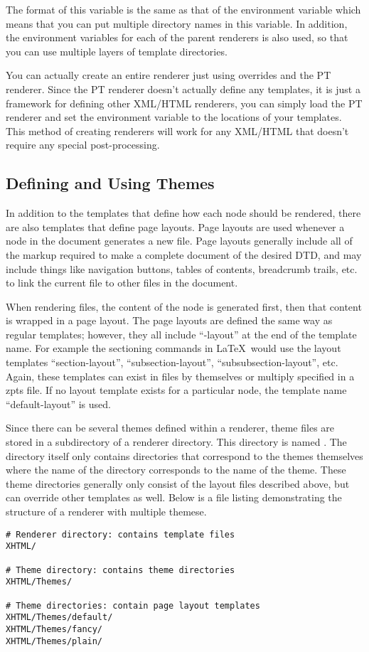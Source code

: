 The format of this variable is the same as that of the 
environment variable which means that you can put multiple directory
names in this variable.  In addition, the environment variables for
each of the parent renderers is also used, so that you can use
multiple layers of template directories.

You can actually create an entire renderer just using overrides and the
PT renderer.  Since the PT renderer doesn't actually define any templates,
it is just a framework for defining other XML/HTML renderers, you can
simply load the PT renderer and set the 
environment
variable to the locations of your templates.  This method of creating
renderers will work for any XML/HTML that doesn't require any special
post-processing.


\subsection{Defining and Using Themes}

In addition to the templates that define how each node should be rendered,
there are also templates that define page layouts.  Page layouts are used
whenever a node in the document generates a new file.   Page layouts
generally include all of the markup required to make a complete document
of the desired DTD, and may include things like navigation buttons,
tables of contents, breadcrumb trails, etc. to link the current file to
other files in the document.

When rendering files, the content of the
node is generated first, then that content is wrapped in a page layout.
The page layouts are defined the same way as regular templates; however,
they all include ``-layout'' at the end of the template name.  For
example the sectioning commands in \LaTeX\ would use the layout templates
``section-layout'', ``subsection-layout'', ``subsubsection-layout'', etc.
Again, these templates can exist in files by themselves or multiply
specified in a zpts file.  If no layout template exists for a particular
node, the template name ``default-layout'' is used.

Since there can be several themes defined within a renderer, theme files
are stored in a subdirectory of a renderer directory.  This directory
is named .  The  directory itself only contains
directories that correspond to the themes themselves where the name
of the directory corresponds to the name of the theme.  These theme
directories generally only consist of the layout files described above,
but can override other templates as well.  Below is a file listing
demonstrating the structure of a renderer with multiple themese.
\begin{verbatim}
# Renderer directory: contains template files
XHTML/

# Theme directory: contains theme directories
XHTML/Themes/

# Theme directories: contain page layout templates
XHTML/Themes/default/
XHTML/Themes/fancy/
XHTML/Themes/plain/
\end{verbatim}


